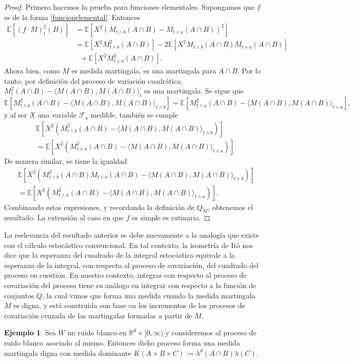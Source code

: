 \documentclass[letterpaper,twoside,12pt]{book}
\newcommand{\R}{\mathbb{R}}
\newcommand{\F}{\mathcal{F}}
\newcommand{\E}{\mathbb{E}}
\newcommand{\W}{\dot{W}}
\newcommand{\1}{\mathds{1}}
\theoremstyle{definition}
\theoremstyle{definition}
\theoremstyle{remark}
\theoremstyle{definition}
\theoremstyle{definition}
\theoremstyle{definition}
\theoremstyle{definition}
\newtheorem{ejem}{Ejemplo}
\theoremstyle{definition}
\begin{document}
\begin{proof} 
   Primero hacemos la prueba para funciones elementales. Supongamos que $f$ es de la forma \eqref{funcionelemental}. Entonces 
   \begin{align*}
      \E\left[(f\cdot M)^2_t(B)\right]&=\E\left[X^2 \left(M_{t\wedge b}(A\cap B)-M_{t\wedge a}(A\cap B)\right)^2\right]\\
      &=\E\left[X^2M_{t\wedge b}^2(A\cap B)\right]-2 \E\left[X^2M_{t\wedge b}(A\cap B)M_{t\wedge a}(A\cap B)\right]\\
      &\ \ \ +\E\left[X^2M^2_{t\wedge a}(A\cap B)\right].
   \end{align*}
   Ahora bien, como $M$ es medida martingala, es una martingala para $A\cap B$. Por lo tanto, por definición del proceso de variación cuadrática, $M^2_t(A\cap B)-\langle M(A\cap B),M(A\cap B)\rangle_t$ es una martingala. Se sigue que 
   \[
   \E\left[M_{t\wedge b}^2(A\cap B)-\langle M(A\cap B),M(A\cap B)\rangle_{t\wedge b}\right]=\E\left[M_{t\wedge a}^2(A\cap B)-\langle M(A\cap B),M(A\cap B)\rangle_{t\wedge a}\right],
   \]
   y al ser $X$ una variable $\F_a$ medible, también se cumple 
      \begin{align*}
         &\E\left[X^2 \left(M_{t\wedge b}^2(A\cap B)-\langle M(A\cap B),M(A\cap B)\rangle_{t\wedge b}\right)\right]\\
         &=\E\left[X^2 \left(M_{t\wedge a}^2(A\cap B)-\langle M(A\cap B),M(A\cap B)\rangle_{t\wedge a}\right)\right].
      \end{align*}
   De manera similar, se tiene la igualdad 
   \begin{align*}
      &\E\left[X^2 \left(M_{t\wedge b}^2(A\cap B)M_{t\wedge a}(A\cap B)-\langle M(A\cap B),M(A\cap B)\rangle_{t\wedge b}\right)\right]\\
      &=\E\left[X^2 \left(M_{t\wedge a}^2(A\cap B)-\langle M(A\cap B),M(A\cap B)\rangle_{t\wedge a}\right)\right].
   \end{align*}
   Combinando estas expresiones, y recordando la definición de $Q_M$, obtenemos el resultado. La extensión al caso en que $f$ es simple es rutinaria.
 \end{proof}
La reelevancia del resultado anterior se debe nuevamente a la analogía que existe con el cálculo estocástico convencional. En tal contexto, la isometría de Itô nos dice que la esperanza del cuadrado de la integral estocástica equivale a la esperanza de la integral, con respecto al proceso de covariación, del cuadrado del proceso en cuestión. En nuestro contexto, integrar con respecto al proceso de covariación del proceso tiene su análogo en integrar con respecto a la función de conjuntos $Q$, la cual vimos que forma una medida cuando la medida martingala $M$ es digna, y está construida con base en los incrementos de los procesos de covariación cruzada de las martingalas formadas a partir de $M$.
\begin{ejem} 
Sea $\W$ un ruido blanco en $\R^{d}\times[0,\infty)$ y consideremos al proceso de ruido blanco asociado al mismo. Entonces dicho proceso forma una medida martingala digna con medida dominante $K(A\times B \times C):=\lambda^{d}(A\cap B)\lambda(C)$.
\end{ejem}
\end{document}
